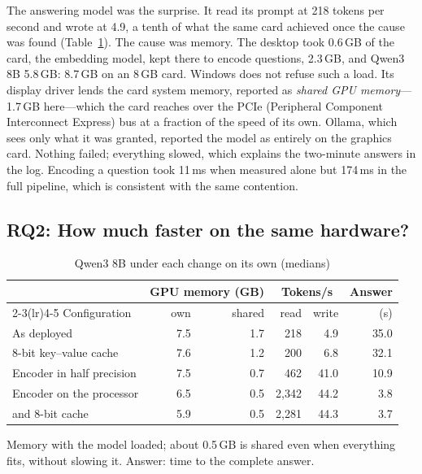 \documentclass[conference]{IEEEtran}
\begin{document}
The answering model was the surprise. It read its prompt at 218 tokens per
second and wrote at 4.9, a tenth of what the same card achieved once the cause
was found (Table~\ref{tab:ablation}). The cause was memory. The desktop took
0.6\,GB of the card, the embedding model, kept there to encode questions,
2.3\,GB, and Qwen3 8B 5.8\,GB: 8.7\,GB on an 8\,GB card. Windows does not refuse
such a load. Its display driver lends the card system memory, reported as
\emph{shared GPU memory}---1.7\,GB here---which the card reaches over the
PCIe (Peripheral Component Interconnect Express) bus at a fraction of the
speed of its own. Ollama, which sees only what it
was granted, reported the model as entirely on the graphics card. Nothing
failed; everything slowed, which explains the two-minute answers in the log.
Encoding a question took 11\,ms when measured alone but 174\,ms in the full
pipeline, which is consistent with the same contention.

\subsection{RQ2: How much faster on the same hardware?}

\begin{table}[t]
\caption{Qwen3 8B under each change on its own (medians)}
\label{tab:ablation}
\centering
\footnotesize
\setlength{\tabcolsep}{3.2pt}
\begin{tabular}{@{}lrrrrr@{}}
\toprule
 & \multicolumn{2}{c}{GPU memory (GB)} & \multicolumn{2}{c}{Tokens/s} & Answer \\
\cmidrule(lr){2-3}\cmidrule(lr){4-5}
Configuration & own & shared & read & write & (s) \\
\midrule
As deployed                     & 7.5 & 1.7 &   218 &  4.9 & 35.0 \\
8-bit key--value cache          & 7.6 & 1.2 &   200 &  6.8 & 32.1 \\
Encoder in half precision       & 7.5 & 0.7 &   462 & 41.0 & 10.9 \\
Encoder on the processor        & 6.5 & 0.5 & 2{,}342 & 44.2 & 3.8 \\
\quad and 8-bit cache           & 5.9 & 0.5 & 2{,}281 & 44.3 & 3.7 \\
\bottomrule
\end{tabular}

\smallskip
\parbox{\columnwidth}{\scriptsize Memory with the model loaded; about 0.5\,GB is
shared even when everything fits, without slowing it. Answer: time to the
complete answer.}
\end{table}
\end{document}
